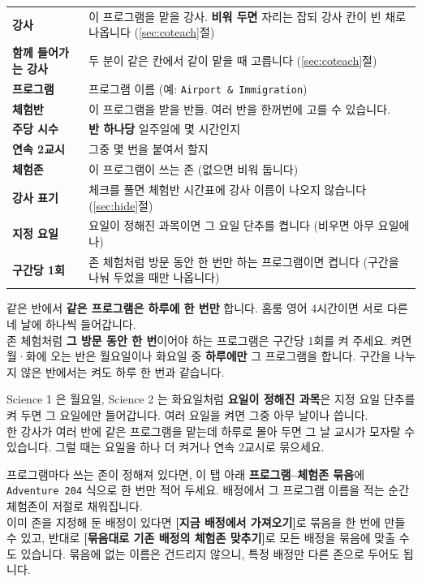 \documentclass[11pt,a4paper]{article}
\newcommand{\btn}[1]{\textcolor{ttdark}{\sffamily\bfseries[#1]}}   %
\newcommand{\tab}[1]{\textcolor{ttblue}{\sffamily\bfseries#1}}      %
\newcommand{\field}[1]{\textsf{#1}}                                 %
\newcommand{\code}[1]{\texttt{\small #1}}
\begin{document}
\begin{center}
\begin{tabularx}{\linewidth}{@{}>{\sffamily\bfseries\color{ttdark}}l X@{}}
\toprule
강사 & 이 프로그램을 맡을 강사. \textbf{비워 두면} 자리는 잡되 강사 칸이 빈 채로 나옵니다 (\ref{sec:coteach}절) \\
함께 들어가는 강사 & 두 분이 같은 칸에서 같이 맡을 때 고릅니다 (\ref{sec:coteach}절) \\
프로그램 & 프로그램 이름 (예: \code{Airport \& Immigration}) \\
체험반 & 이 프로그램을 받을 반들. 여러 반을 한꺼번에 고를 수 있습니다. \\
주당 시수 & \textbf{반 하나당} 일주일에 몇 시간인지 \\
연속 2교시 & 그중 몇 번을 붙여서 할지 \\
체험존 & 이 프로그램이 쓰는 존 (없으면 비워 둡니다) \\
강사 표기 & 체크를 풀면 체험반 시간표에 강사 이름이 나오지 않습니다 (\ref{sec:hide}절) \\
지정 요일 & 요일이 정해진 과목이면 그 요일 단추를 켭니다 (비우면 아무 요일에나) \\
구간당 1회 & 존 체험처럼 방문 동안 한 번만 하는 프로그램이면 켭니다 (구간을 나눠 두었을 때만 나옵니다) \\
\bottomrule
\end{tabularx}
\end{center}

\begin{warn}
같은 반에서 \textbf{같은 프로그램은 하루에 한 번만} 합니다.
홈룸 영어 4시간이면 서로 다른 네 날에 하나씩 들어갑니다.\\[2pt]
존 체험처럼 \textbf{그 방문 동안 한 번}이어야 하는 프로그램은 \field{구간당 1회}를 켜 주세요.
켜면 월·화에 오는 반은 월요일이나 화요일 중 \textbf{하루에만} 그 프로그램을 합니다.
구간을 나누지 않은 반에서는 켜도 하루 한 번과 같습니다.
\end{warn}

\begin{tip}
Science 1 은 월요일, Science 2 는 화요일처럼 \textbf{요일이 정해진 과목}은
\field{지정 요일} 단추를 켜 두면 그 요일에만 들어갑니다. 여러 요일을 켜면 그중 아무 날이나 씁니다.\\[2pt]
한 강사가 여러 반에 같은 프로그램을 맡는데 하루로 몰아 두면 그 날 교시가 모자랄 수 있습니다.
그럴 때는 요일을 하나 더 켜거나 연속 2교시로 묶으세요.
\end{tip}

\begin{tip}
프로그램마다 쓰는 존이 정해져 있다면, 이 탭 아래 \tab{프로그램--체험존 묶음}에
\code{Adventure \textrightarrow{} 204} 식으로 한 번만 적어 두세요.
배정에서 그 프로그램 이름을 적는 순간 \field{체험존}이 저절로 채워집니다.\\[2pt]
이미 존을 지정해 둔 배정이 있다면 \btn{지금 배정에서 가져오기}로 묶음을 한 번에 만들 수 있고,
반대로 \btn{묶음대로 기존 배정의 체험존 맞추기}로 모든 배정을 묶음에 맞출 수도 있습니다.
묶음에 없는 이름은 건드리지 않으니, 특정 배정만 다른 존으로 두어도 됩니다.
\end{tip}
\end{document}
